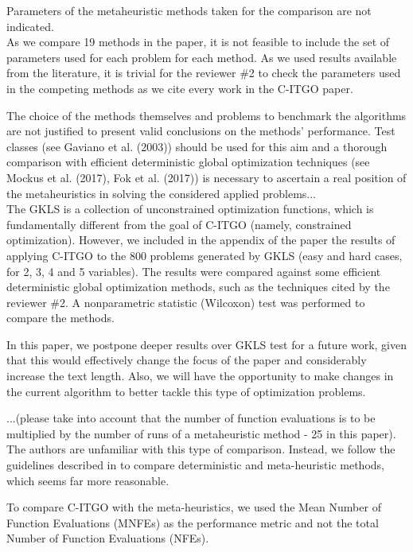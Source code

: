 \vspace{1cm}


{\color{red} Parameters of the metaheuristic methods taken for the comparison are not indicated.} \\

As we compare 19 methods in the paper, it is not feasible to include the set of parameters used for each problem for each method. As we used results available from the literature, it is trivial for the reviewer \#2 to check the parameters used in the competing methods as we cite every work in the C-ITGO paper.


\vspace{1cm}


{\color{red} The choice of the methods themselves and problems to benchmark the algorithms are not justified to present valid conclusions on the methods' performance. Test classes (see Gaviano et al. (2003)) should be used for this aim and a thorough comparison with efficient deterministic global optimization techniques (see Mockus et al. (2017), Fok et al. (2017)) is necessary to ascertain a real position of the metaheuristics in solving the considered applied problems...} \\

The GKLS \cite{GKLS} is a collection of unconstrained optimization functions, which is fundamentally different from the goal of C-ITGO (namely, constrained optimization). However, we included in the appendix of the paper the results of applying C-ITGO to the 800 problems generated by GKLS (easy and hard cases, for 2, 3, 4 and 5 variables). The results were compared against some efficient deterministic global optimization methods, such as the techniques cited by the reviewer \#2. A nonparametric statistic (Wilcoxon) test was performed to compare the methods.

In this paper, we postpone deeper results over GKLS test for a future work, given that this would effectively change the focus of the paper and considerably increase the text length. Also, we will have the opportunity to make changes in the current algorithm to better tackle this type of optimization problems.

\vspace{1cm}



{\color{red} ...(please take into account that the number of function evaluations is to be multiplied by the number of runs of a metaheuristic method - 25 in this paper). } \\

The authors are unfamiliar with this type of comparison. Instead, we follow the guidelines described in \cite{NAT} to compare deterministic and meta-heuristic methods, which seems far more reasonable. 

To compare C-ITGO with the meta-heuristics, we used the Mean Number of Function Evaluations (MNFEs) as the performance metric and not the total Number of Function Evaluations (NFEs).


\vspace{1cm}
